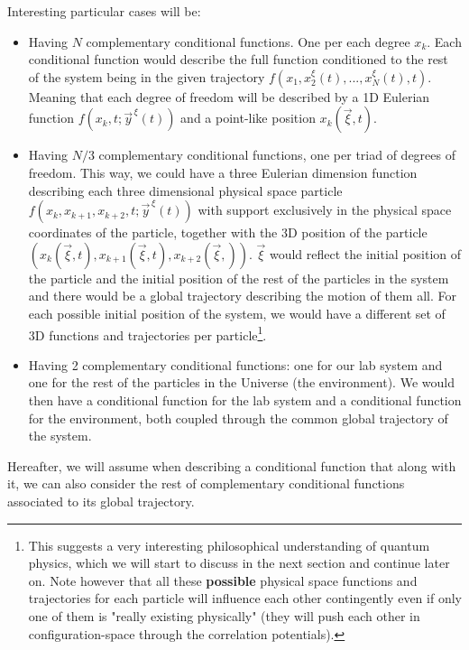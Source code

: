 \documentclass[11pt, a4paper]{article} %
\begin{document}
Interesting particular cases will be:
\begin{itemize}
\item Having $N$ complementary conditional functions. One per each degree $x_k$. Each conditional function would describe the full function conditioned to the rest of the system being in the given trajectory $f(x_1,x_2^\xi(t),...,x_N^\xi(t),t)$. Meaning that each degree of freedom will be described by a 1D Eulerian function $f(x_k,t;\vec{y}^{\, \xi}(t))$ and a point-like position $x_k(\vec{\xi},t)$.
\item Having $N/3$ complementary conditional functions, one per triad of degrees of freedom. This way, we could have a three Eulerian dimension function describing each three dimensional physical space particle $f(x_k,x_{k+1},x_{k+2},t; \vec{y}^{\, \xi}(t))$ with support exclusively in the physical space coordinates of the particle, together with the 3D position of the particle $(x_{k}(\vec{\xi},t), x_{k+1}(\vec{\xi},t),x_{k+2}(\vec{\xi},))$. $\vec{\xi}$ would reflect the initial position of the particle and the initial position of the rest of the particles in the system and there would be a global trajectory describing the motion of them all. For each possible initial position of the system, we would have a different set of 3D functions and trajectories per particle\footnote{ This suggests a very interesting philosophical understanding of quantum physics, which we will start to discuss in the next section and continue later on. Note however that all these {\bf possible} physical space functions and trajectories for each particle will influence each other contingently even if only one of them is "really existing physically" (they will push each other in configuration-space through the correlation potentials).}.
\item Having 2 complementary conditional functions: one for our lab system and one for the rest of the particles in the Universe (the environment). We would then have a conditional function for the lab system and a conditional function for the environment, both coupled through the common global trajectory of the system.
\end{itemize} 
Hereafter, we will assume when describing a conditional function that along with it, we can also consider the rest of complementary conditional functions associated to its global trajectory.
\end{document}
